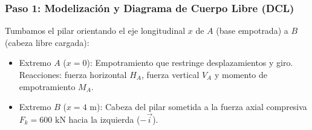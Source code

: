 \subsubsection*{Paso 1: Modelización y Diagrama de Cuerpo Libre (DCL)}
Tumbamos el pilar orientando el eje longitudinal $x$ de $A$ (base empotrada) a $B$ (cabeza libre cargada):
\begin{itemize}
    \item Extremo $A$ ($x = 0$): Empotramiento que restringe desplazamientos y giro. Reacciones: fuerza horizontal $H_A$, fuerza vertical $V_A$ y momento de empotramiento $M_A$.
    \item Extremo $B$ ($x = 4\text{ m}$): Cabeza del pilar sometida a la fuerza axial compresiva $F_k = 600\text{ kN}$ hacia la izquierda ($-\vec{i}$).
\end{itemize}

